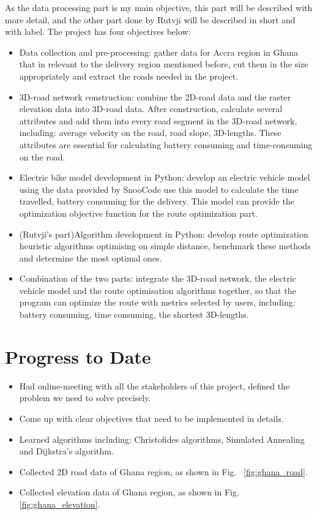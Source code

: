 \documentclass[project-plan]{report-template}
\begin{document}
As the data processing part is my main objective, this part will be described with more detail,
and the other part done by Rutvji will be described in short and with label. 
The project has four objectives below:
\begin{itemize}
    \item Data collection and pre-processing: gather data for Accra region in Ghana that in
          relevant to the delivery region mentioned before, cut them in the size appropriately and extract the roads needed in the project. 
    \item 3D-road network construction: combine the 2D-road data and the raster elevation data into 3D-road data.
          After construction, calculate several attributes and add them into every road segment in the 3D-road network, including: average velocity on the road, road slope, 3D-lengths.
          These attributes are essential for calculating battery consuming and time-consuming on the road.
    \item Electric bike model development in Python: develop an electric vehicle model
          using the data provided by SnooCode
          use this model to calculate the time travelled, battery consuming for the delivery.
          This model can provide the optimization objective function for the route optimization part.
    \item (Rutvji's part)Algorithm development in Python: develop route optimization heuristic algorithms optimising on simple distance, benchmark these methods and determine the most optimal ones. 
    \item Combination of the two parts: integrate the 3D-road network, the electric vehicle model and the route optimisation algorithms together, 
          so that the program can optimize the route with metrics selected by users, including: battery consuming, time consuming, the shortest 3D-lengths.
\end{itemize}

\section {Progress to Date}
\begin{itemize}
    \item Had online-meeting with all the stakeholders of this project, defined the problem we need to solve precisely.
    \item Come up with clear objectives that need to be implemented in details.
    \item Learned algorithms including: Christofides algorithms, Simulated Annealing and Dijkstra's algorithm.
    \item Collected 2D road data of Ghana region, as shown in Fig.~ \ref{fig:ghana_road}. 
    \item Collected elevation data of Ghana region, as shown in Fig.~ \ref{fig:ghana_elevation}.
\end{itemize}
\end{document}
